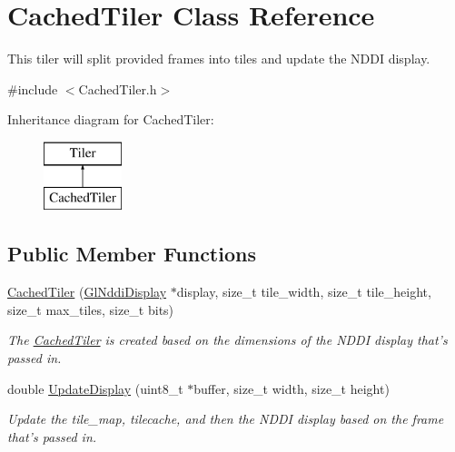 \hypertarget{class_cached_tiler}{
\section{CachedTiler Class Reference}
\label{class_cached_tiler}
}


This tiler will split provided frames into tiles and update the NDDI display.  




{\ttfamily \#include $<$CachedTiler.h$>$}

Inheritance diagram for CachedTiler:\begin{figure}[H]
\begin{center}
\leavevmode
\includegraphics[height=2.000000cm]{class_cached_tiler}
\end{center}
\end{figure}
\subsection*{Public Member Functions}
\begin{DoxyCompactItemize}
\item 
\hyperlink{class_cached_tiler_ac191ac814d922b44401356537e9c4368}{CachedTiler} (\hyperlink{class_gl_nddi_display}{GlNddiDisplay} $\ast$display, size\_\-t tile\_\-width, size\_\-t tile\_\-height, size\_\-t max\_\-tiles, size\_\-t bits)
\begin{DoxyCompactList}\small\item\em The \hyperlink{class_cached_tiler}{CachedTiler} is created based on the dimensions of the NDDI display that's passed in. \item\end{DoxyCompactList}\item 
double \hyperlink{class_cached_tiler_a9926f3bafa7ec9e65242bab8368f8b43}{UpdateDisplay} (uint8\_\-t $\ast$buffer, size\_\-t width, size\_\-t height)
\begin{DoxyCompactList}\small\item\em Update the tile\_\-map, tilecache, and then the NDDI display based on the frame that's passed in. \item\end{DoxyCompactList}\end{DoxyCompactItemize}


